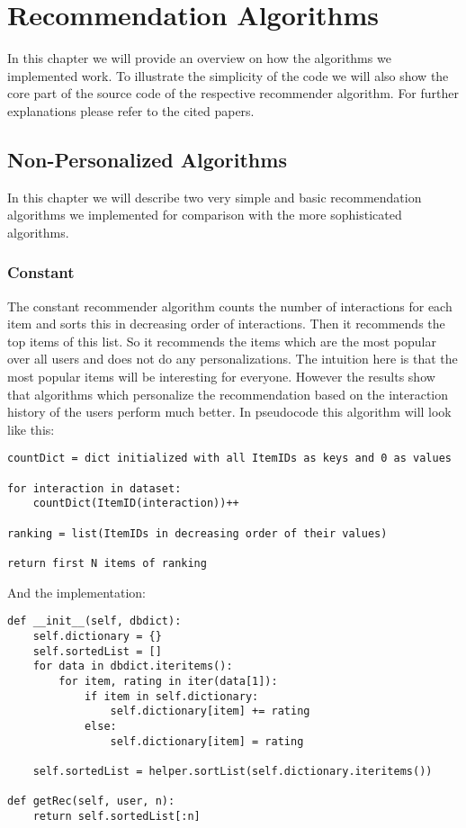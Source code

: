 
\chapter{Recommendation Algorithms}
\label{recommendationalgorithms}
In this chapter we will provide an overview on how the algorithms we implemented
work. To illustrate the simplicity of the code we will also show the core part of 
the source code of the respective recommender algorithm.
For further explanations please refer to the cited papers.


\section{Non-Personalized Algorithms}

In this chapter we will describe two very simple and basic recommendation
algorithms we implemented for comparison with the more sophisticated
algorithms.


\subsection{Constant}

The constant recommender algorithm counts the number of interactions
for each item and sorts this in decreasing order of interactions.
Then it recommends the top items of this list. So it recommends the
items which are the most popular over all users and does not do any
personalizations. The intuition here is that the most popular items
will be interesting for everyone. However the results show that
algorithms which personalize the recommendation based on the 
interaction history of the users perform much better.
In pseudocode this algorithm will look like this:
\begin{lstlisting}
countDict = dict initialized with all ItemIDs as keys and 0 as values

for interaction in dataset:
    countDict(ItemID(interaction))++

ranking = list(ItemIDs in decreasing order of their values)

return first N items of ranking
\end{lstlisting}
And the implementation:
\begin{lstlisting}
def __init__(self, dbdict):
    self.dictionary = {}
    self.sortedList = []
    for data in dbdict.iteritems():
        for item, rating in iter(data[1]):
            if item in self.dictionary:
                self.dictionary[item] += rating
            else:
                self.dictionary[item] = rating

    self.sortedList = helper.sortList(self.dictionary.iteritems())

def getRec(self, user, n):
    return self.sortedList[:n]
\end{lstlisting}



